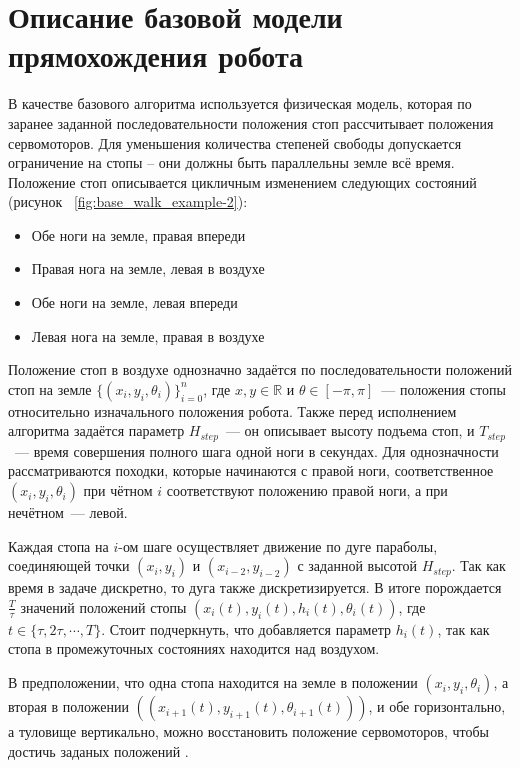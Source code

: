 \chapter{Описание базовой модели прямохождения робота}\label{ch:ch3}
В качестве базового алгоритма используется физическая модель, которая по заранее заданной последовательности положения стоп рассчитывает положения сервомоторов. Для уменьшения количества степеней свободы допускается ограничение на стопы – они должны быть параллельны земле всё время. Положение стоп описывается цикличным изменением следующих состояний (рисунок ~\cref{fig:base_walk_example-2}):
\begin{itemize}
  \item Обе ноги на земле, правая впереди
  \item Правая нога на земле, левая в воздухе
  \item Обе ноги на земле, левая впереди
  \item Левая нога на земле, правая в воздухе
\end{itemize}

Положение стоп в воздухе однозначно задаётся по последовательности положений стоп на земле $\{(x_i, y_i, \theta_i)\}_{i=0}^{n}$, где $x, y\in \mathbb{R}$ и $\theta \in [-\pi, \pi]$~--- положения стопы относительно изначального положения робота. Также перед исполнением алгоритма задаётся параметр $H_{step}$~--- он описывает высоту подъема стоп, и $T_{step}$~--- время совершения полного шага одной ноги в секундах. Для однозначности рассматриваются походки, которые начинаются с правой ноги, соответственное $(x_i, y_i, \theta_i)$ при чётном $i$ соответствуют положению правой ноги, а при нечётном~--- левой.

Каждая стопа на $i$-ом шаге осуществляет движение по дуге параболы, соединяющей точки $(x_i, y_i)$ и $(x_{i-2}, y_{i-2})$ с заданной высотой $H_{step}$. Так как время в задаче дискретно, то дуга также дискретизируется. В итоге порождается $\frac{T}{\tau}$ значений положений стопы $(x_i(t), y_i(t), h_i(t), \theta_i(t))$, где $t \in \{\tau, 2\tau, \cdots, T\}$. Стоит подчеркнуть, что добавляется параметр $h_i(t)$, так как стопа в промежуточных состояниях находится над воздухом.

В предположении, что одна стопа находится на земле в положении $(x_i, y_i, \theta_i)$, а вторая в положении $((x_{i+1}(t), y_{i+1}(t), \theta_{i+1}(t)))$, и обе горизонтально, а туловище вертикально, можно восстановить положение сервомоторов, чтобы достичь заданых положений \cite{inverse_1995}.

